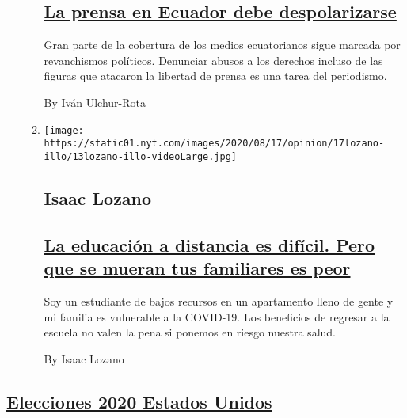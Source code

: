 \begin{enumerate}
\begin{enumerate}
    \hypertarget{la-prensa-en-ecuador-debe-despolarizarse}{%
    \subsection{\texorpdfstring{\href{/es/2020/08/10/espanol/opinion/ecuador-rafael-correa.html}{La
    prensa en Ecuador debe
    despolarizarse}}{La prensa en Ecuador debe despolarizarse}}\label{la-prensa-en-ecuador-debe-despolarizarse}}

    Gran parte de la cobertura de los medios ecuatorianos sigue marcada
    por revanchismos políticos. Denunciar abusos a los derechos incluso
    de las figuras que atacaron la libertad de prensa es una tarea del
    periodismo.

    By Iván Ulchur-Rota
  \item
    \texttt{[image: https://static01.nyt.com/images/2020/08/17/opinion/17lozano-illo/13lozano-illo-videoLarge.jpg]}

    \hypertarget{isaac-lozano}{%
    \subsection{Isaac Lozano}\label{isaac-lozano}}

    \hypertarget{la-educaciuxf3n-a-distancia-es-difuxedcil-pero-que-se-mueran-tus-familiares-es-peor}{%
    \subsection{\texorpdfstring{\href{/es/2020/08/17/espanol/opinion/covid-regreso-clases-estudiante.html}{La
    educación a distancia es difícil. Pero que se mueran tus familiares
    es
    peor}}{La educación a distancia es difícil. Pero que se mueran tus familiares es peor}}\label{la-educaciuxf3n-a-distancia-es-difuxedcil-pero-que-se-mueran-tus-familiares-es-peor}}

    Soy un estudiante de bajos recursos en un apartamento lleno de gente
    y mi familia es vulnerable a la COVID-19. Los beneficios de regresar
    a la escuela no valen la pena si ponemos en riesgo nuestra salud.

    By Isaac Lozano
  \end{enumerate}
\end{enumerate}

\hypertarget{elecciones-2020-estados-unidos}{%
\subsection{\texorpdfstring{\protect\hyperlink{}{Elecciones 2020 Estados
Unidos}}{Elecciones 2020 Estados Unidos}}\label{elecciones-2020-estados-unidos}}

